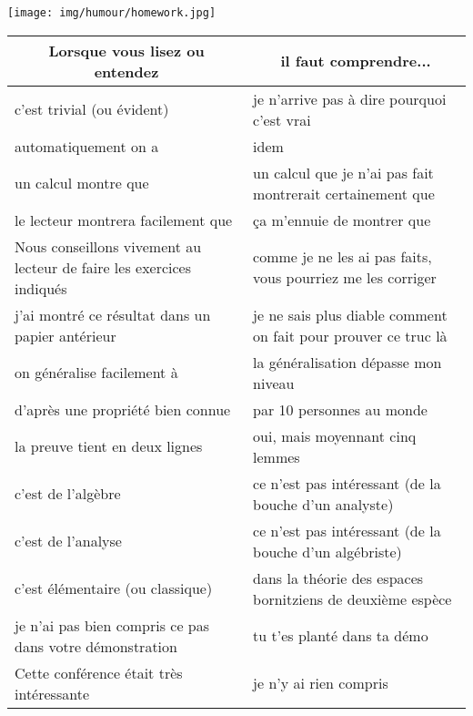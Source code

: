 	\begin{center}\underline{\hspace{5 cm}}\end{center}
	\begin{center}
		\texttt{[image: img/humour/homework.jpg]}	
	\end{center}

	\begin{table}[H]
	\begin{center}
			\begin{tabular}{|p{7.5cm}|p{7.5cm}|}
				\hline
				\multicolumn{1}{c}{\cellcolor{black!30}\textbf{
Lorsque vous lisez ou entendez}} & 
  \multicolumn{1}{c}{\cellcolor{black!30}\textbf{il faut comprendre...}} \\ \hline
				c'est trivial (ou évident) & je n'arrive pas à dire pourquoi c'est vrai \\ \hline
				automatiquement on a & idem \\ \hline
				un calcul montre que & un calcul que je n'ai pas fait montrerait certainement que\\ \hline
				le lecteur montrera facilement que & ça m'ennuie de montrer que\\ \hline
				Nous conseillons vivement au lecteur de faire les exercices indiqués & comme je ne les ai pas faits, vous pourriez me les corriger\\ \hline
				j'ai montré ce résultat dans un papier antérieur & je ne sais plus diable comment on fait pour prouver ce truc là
				\\ \hline
				on généralise facilement à & la généralisation dépasse mon niveau			
				\\ \hline
				d'après une propriété bien connue & par 10 personnes au monde
				\\ \hline
				la preuve tient en deux lignes & 	oui, mais moyennant cinq lemmes
				\\ \hline
				c'est de l'algèbre & ce n'est pas intéressant (de la bouche d'un analyste)
				\\ \hline
				c'est de l'analyse & ce n'est pas intéressant (de la bouche d'un algébriste)
				\\ \hline
				c'est élémentaire (ou classique) & dans la théorie des espaces bornitziens de deuxième espèce
				\\ \hline
				je n'ai pas bien compris ce pas dans votre démonstration & tu t'es planté dans ta démo
				\\ \hline
				Cette conférence était très intéressante & 	je n'y ai rien compris
				\\ \hline
		\end{tabular}
	\end{center}
	\end{table}	
	
